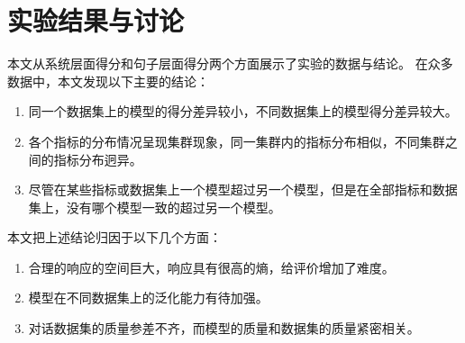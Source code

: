 % 
% 
% 
% 

\chapter{实验结果与讨论}\label{ch:experiment}
本文从系统层面得分和句子层面得分两个方面展示了实验的数据与结论。 在众多数据中，本文发现以下主要的结论：
\begin{enumerate}
    \item 同一个数据集上的模型的得分差异较小，不同数据集上的模型得分差异较大。
    \item 各个指标的分布情况呈现集群现象，同一集群内的指标分布相似，不同集群之间的指标分布迥异。
    \item 尽管在某些指标或数据集上一个模型超过另一个模型，但是在全部指标和数据集上，没有哪个模型一致的超过另一个模型。
\end{enumerate}
本文把上述结论归因于以下几个方面：
\begin{enumerate}
    \item 合理的响应的空间巨大，响应具有很高的熵，给评价增加了难度。
    \item 模型在不同数据集上的泛化能力有待加强。
    \item 对话数据集的质量参差不齐，而模型的质量和数据集的质量紧密相关。
\end{enumerate}

